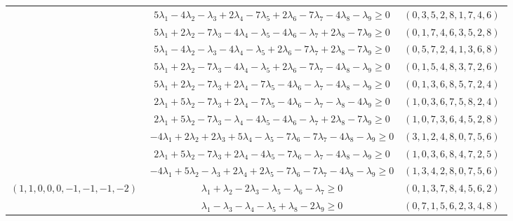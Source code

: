 \documentclass[12pt,landscape]{article}
\begin{document}
\begin{longtable}[l]{|c|c|c|}
 \cline{2-3} 
 & $5\lambda_{1}-4\lambda_{2}-\lambda_{3} + 2\lambda_{4}-7\lambda_{5} + 2\lambda_{6}-7\lambda_{7}-4\lambda_{8}-\lambda_{9}\geq 0$ & $(0 ,3 ,5 ,2 ,8 ,1 ,7 ,4 ,6) \;$\\ 
 \cline{2-3} 
 & $5\lambda_{1} + 2\lambda_{2}-7\lambda_{3}-4\lambda_{4}-\lambda_{5}-4\lambda_{6}-\lambda_{7} + 2\lambda_{8}-7\lambda_{9}\geq 0$ & $(0 ,1 ,7 ,4 ,6 ,3 ,5 ,2 ,8) \;$\\ 
 \cline{2-3} 
 & $5\lambda_{1}-4\lambda_{2}-\lambda_{3}-4\lambda_{4}-\lambda_{5} + 2\lambda_{6}-7\lambda_{7} + 2\lambda_{8}-7\lambda_{9}\geq 0$ & $(0 ,5 ,7 ,2 ,4 ,1 ,3 ,6 ,8) \;$\\ 
 \cline{2-3} 
 & $5\lambda_{1} + 2\lambda_{2}-7\lambda_{3}-4\lambda_{4}-\lambda_{5} + 2\lambda_{6}-7\lambda_{7}-4\lambda_{8}-\lambda_{9}\geq 0$ & $(0 ,1 ,5 ,4 ,8 ,3 ,7 ,2 ,6) \;$\\ 
 \cline{2-3} 
 & $5\lambda_{1} + 2\lambda_{2}-7\lambda_{3} + 2\lambda_{4}-7\lambda_{5}-4\lambda_{6}-\lambda_{7}-4\lambda_{8}-\lambda_{9}\geq 0$ & $(0 ,1 ,3 ,6 ,8 ,5 ,7 ,2 ,4) \;$\\ 
 \cline{2-3} 
 & $2\lambda_{1} + 5\lambda_{2}-7\lambda_{3} + 2\lambda_{4}-7\lambda_{5}-4\lambda_{6}-\lambda_{7}-\lambda_{8}-4\lambda_{9}\geq 0$ & $(1 ,0 ,3 ,6 ,7 ,5 ,8 ,2 ,4) \;$\\ 
 \cline{2-3} 
 & $2\lambda_{1} + 5\lambda_{2}-7\lambda_{3}-\lambda_{4}-4\lambda_{5}-4\lambda_{6}-\lambda_{7} + 2\lambda_{8}-7\lambda_{9}\geq 0$ & $(1 ,0 ,7 ,3 ,6 ,4 ,5 ,2 ,8) \;$\\ 
 \cline{2-3} 
 & $-4\lambda_{1} + 2\lambda_{2} + 2\lambda_{3} + 5\lambda_{4}-\lambda_{5}-7\lambda_{6}-7\lambda_{7}-4\lambda_{8}-\lambda_{9}\geq 0$ & $(3 ,1 ,2 ,4 ,8 ,0 ,7 ,5 ,6) \;$\\ 
 \cline{2-3} 
 & $2\lambda_{1} + 5\lambda_{2}-7\lambda_{3} + 2\lambda_{4}-4\lambda_{5}-7\lambda_{6}-\lambda_{7}-4\lambda_{8}-\lambda_{9}\geq 0$ & $(1 ,0 ,3 ,6 ,8 ,4 ,7 ,2 ,5) \;$\\ 
 \cline{2-3} 
 & $-4\lambda_{1} + 5\lambda_{2}-\lambda_{3} + 2\lambda_{4} + 2\lambda_{5}-7\lambda_{6}-7\lambda_{7}-4\lambda_{8}-\lambda_{9}\geq 0$ & $(1 ,3 ,4 ,2 ,8 ,0 ,7 ,5 ,6) \;$\\ \hline\multirow{10}{*}{ $(1 ,1 ,0 ,0 ,0 ,-1 ,-1 ,-1 ,-2) \;$ }  & $\lambda_{1} + \lambda_{2}-2\lambda_{3}-\lambda_{5}-\lambda_{6}-\lambda_{7}\geq 0$ & $(0 ,1 ,3 ,7 ,8 ,4 ,5 ,6 ,2) \;$\\ 
 \cline{2-3} 
 & $\lambda_{1}-\lambda_{3}-\lambda_{4}-\lambda_{5} + \lambda_{8}-2\lambda_{9}\geq 0$ & $(0 ,7 ,1 ,5 ,6 ,2 ,3 ,4 ,8) \;$\\ 

\end{longtable}
\end{document}
